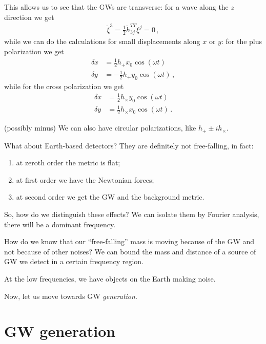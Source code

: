 \documentclass[main.tex]{subfiles}
\begin{document}
This allows us to see that the GWs are transverse: for a wave along the \(z\) direction we get 
%
\begin{align}
\ddot{\xi}^{3} = \frac{1}{2} \ddot{h}_{3j}^{TT} \xi^{j} = 0
\,,
\end{align}
%
while we can do the calculations for small displacements along \(x\) or \(y\): for the plus polarization we get 
%
\begin{subequations}
\begin{align}
  \delta x &= \frac{1}{2} h_{+} x_0 \cos(\omega t)  \\
  \delta y &= - \frac{1}{2} h_{+} y_0 \cos(\omega t)  
\,,
\end{align}
\end{subequations}
%
while for the cross polarization we get 
%
\begin{subequations}
\begin{align}
\delta x &= \frac{1}{2} h_{ \times } y_0 \cos(\omega t)  \\
\delta y &= \frac{1}{2} h_{ \times } x_0 \cos(\omega t)  
\,.
\end{align}
\end{subequations}

(possibly minus)
We can also have circular polarizations, like \(h_+ \pm i h_{  \times }\). 

What about Earth-based detectors? 
They are definitely not free-falling, in fact: 
\begin{enumerate}
  \item at zeroth order the metric is flat;
  \item at first order we have the Newtonian forces;
  \item at second order we get the GW and the background metric.
\end{enumerate}

So, how do we distinguish these effects? We can isolate them by Fourier analysis, there will be a dominant frequency. 

How do we know that our ``free-falling'' mass is moving because of the GW and not because of other noises?
We can bound the mass and distance of a source of GW we detect in a certain frequency region. 

At the low frequencies, we have objects on the Earth making noise. 

Now, let us move towards GW \emph{generation}.

\chapter{GW generation}
\end{document}

